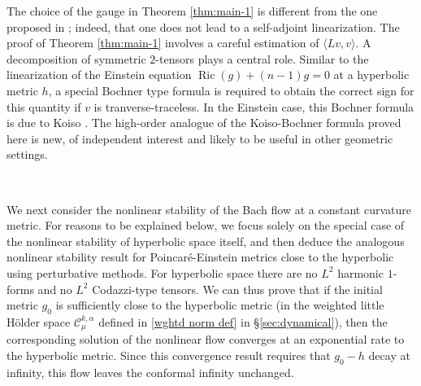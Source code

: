 \documentclass[10pt,reqno]{amsart}
\DeclareMathOperator{\Ric}{Ric}
\begin{document}
The choice of the gauge in Theorem \ref{thm:main-1} is different from the one proposed in \cite{BH1}; indeed, that one does not lead to a 
self-adjoint linearization.  The proof of Theorem \ref{thm:main-1} involves a careful estimation of $\langle Lv, v\rangle$. A decomposition of symmetric
$2$-tensors plays a central role. Similar to the linearization of the Einstein equation $\Ric(g) + (n-1) g = 0$ at a hyperbolic metric $h$, a special Bochner type formula 
is required to obtain the correct sign for this quantity if $v$ is tranverse-traceless. In the Einstein case, this Bochner formula is due to Koiso \cite{Koiso}.  The 
high-order analogue of the Koiso-Bochner formula proved here is new, of independent interest and likely to be useful in other geometric settings.

\

We next consider the nonlinear stability of the Bach flow at a constant curvature metric.   For reasons to be explained below, we focus solely on the special case of the nonlinear stability of hyperbolic space itself, and then deduce the analogous nonlinear stability result for Poincar\'e-Einstein metrics close to the hyperbolic using
perturbative methods.  For hyperbolic space there are no $L^2$ harmonic $1$-forms and no $L^2$ Codazzi-type tensors. We can thus prove that 
if the initial metric $g_0$ is sufficiently close to the hyperbolic metric (in the weighted little H\"older space ${\mathcal C^{k,\alpha}_{\mu}}$ defined in \eqref{wghtd norm def} in \S \ref{sec:dynamical}), 
then the corresponding solution of the nonlinear flow converges at an exponential rate to the hyperbolic metric.  Since this convergence result requires that $g_0-h$ decay at infinity,
this flow leaves the conformal infinity unchanged. 

\ 
\end{document}
